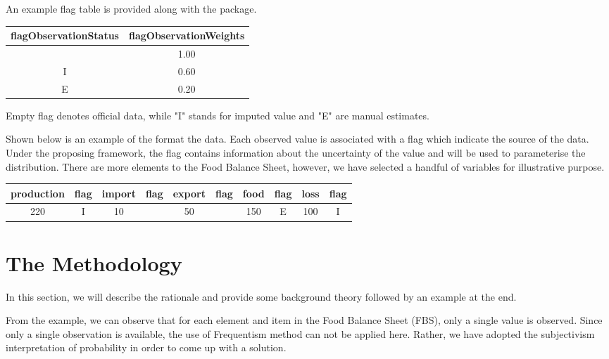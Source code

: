 \documentclass[nojss]{jss}\usepackage[]{graphicx}\usepackage[]{color}
\begin{document}
An example flag table is provided along with the package.



\begin{table}[ht]
\centering
\begin{tabular}{cc}
  \hline
flagObservationStatus & flagObservationWeights \\ 
  \hline
 & 1.00 \\ 
  I & 0.60 \\ 
  E & 0.20 \\ 
   \hline
\end{tabular}
\end{table}


Empty flag denotes official data, while "I" stands for imputed value
and "E" are manual estimates.


Shown below is an example of the format the data. Each observed value
is associated with a flag which indicate the source of the data. Under
the proposing framework, the flag contains information about the
uncertainty of the value and will be used to parameterise the
distribution. There are more elements to the Food Balance Sheet,
however, we have selected a handful of variables for illustrative
purpose.



\begin{table}[ht]
\centering
\begin{tabular}{cccccccccc}
  \hline
production & flag & import & flag & export & flag & food & flag & loss & flag \\ 
  \hline
220 & I & 10 &  & 50 &  & 150 & E & 100 & I \\ 
   \hline
\end{tabular}
\end{table}





\section{The Methodology}

In this section, we will describe the rationale and provide some
background theory followed by an example at the end.

From the example, we can observe that for each element and item in the
Food Balance Sheet (FBS), only a single value is observed. Since only
a single observation is available, the use of Frequentism method can
not be applied here. Rather, we have adopted the subjectivism
interpretation of probability in order to come up with a solution.
\end{document}
